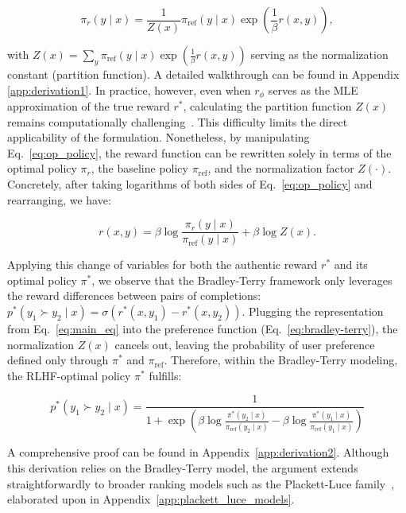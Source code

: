 \begin{equation}\label{eq:op_policy}
    \pi_r(y\mid x) = \frac{1}{Z(x)}\pi_\text{ref}(y\mid x)\exp\left(\frac{1}{\beta}r(x, y)\right),
\end{equation}

with $Z(x) =\sum_{y}\pi_\text{ref}(y\mid x)\exp\left(\frac{1}{\beta}r(x, y)\right)$ serving as the normalization constant (partition function). A detailed walkthrough can be found in Appendix \ref{app:derivation1}. In practice, however, even when $r_{\phi}$ serves as the MLE approximation of the true reward $r^*$, calculating the partition function $Z(x)$ remains computationally challenging~\citep{korbak2022reinforcement, go2023aligning}. This difficulty limits the direct applicability of the formulation. Nonetheless, by manipulating Eq.~\ref{eq:op_policy}, the reward function can be rewritten solely in terms of the optimal policy $\pi_r$, the baseline policy $\pi_\text{ref}$, and the normalization factor $Z(\cdot)$. Concretely, after taking logarithms of both sides of Eq.~\ref{eq:op_policy} and rearranging, we have:

\begin{equation}\label{eq:main_eq}
    r(x,y) =\beta \log \frac{\pi_r(y\mid x)}{\pi_\text{ref}(y\mid x)} + \beta \log Z(x).
\end{equation}

Applying this change of variables for both the authentic reward $r^*$ and its optimal policy $\pi^*$, we observe that the Bradley-Terry framework only leverages the reward differences between pairs of completions: ${p^*(y_1 \succ y_2 \mid x) = \sigma(r^*(x, y_1) - r^*(x, y_2))}$. Plugging the representation from Eq.~\ref{eq:main_eq} into the preference function (Eq.~\ref{eq:bradley-terry}), the normalization $Z(x)$ cancels out, leaving the probability of user preference defined only through $\pi^*$ and $\pi_\text{ref}$. Therefore, within the Bradley-Terry modeling, the RLHF-optimal policy $\pi^*$ fulfills:

\begin{equation}\label{eq:objective}
    p^*(y_1\succ y_2 \mid x)=\frac{1}{1 + \exp\left(\beta \log \frac{\pi^*(y_2\mid x)}{\pi_\text{ref}(y_2\mid x)} - \beta \log \frac{\pi^*(y_1\mid x)}{\pi_\text{ref}(y_1\mid x)}\right)}
\end{equation}

A comprehensive proof can be found in Appendix~\ref{app:derivation2}. Although this derivation relies on the Bradley-Terry model, the argument extends straightforwardly to broader ranking models such as the Plackett-Luce family~\citep{plackett1975analysis, luce2012individual}, elaborated upon in Appendix~\ref{app:plackett_luce_models}.


